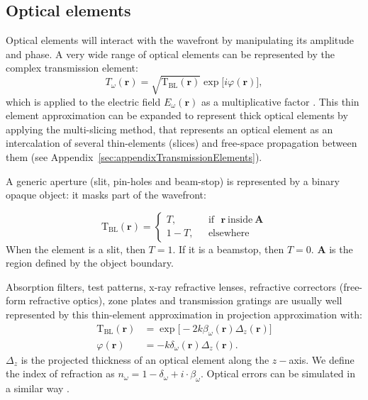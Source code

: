 \documentclass{iucr}              %
\begin{document}
\subsection{Optical elements}\label{sec:OE}

Optical elements will interact with the wavefront by manipulating its amplitude and phase. A very wide range of optical elements can be represented by the complex transmission element:
 \begin{equation}\label{eq:trans_el}
T_\omega(\textbf{r})=\sqrt{\mathrm{T}_\mathrm{BL}(\textbf{r})}\exp{\big[ i\varphi(\textbf{r})\big]},
\end{equation}
which is applied to the electric field $E_\omega(\textbf{r})$ as a multiplicative factor \cite{Cloetens_1996}. This thin element approximation can be expanded to represent thick optical elements by applying the multi-slicing method, that represents an optical element as an intercalation of several thin-elements (slices) and free-space propagation between them \cite{paganin_book, Li2017, Munro2019} (see Appendix~\ref{sec:appendixTransmissionElements}). 

A generic aperture (slit, pin-holes and beam-stop) is represented by a binary opaque object: it masks part of the wavefront:

\begin{equation}
\mathrm{T}_{\text{BL}}(\textbf{r}) =
\left\{
\begin{matrix}
T,  & \mbox{~~if~~}  \textbf{r}~\text{inside}~ \textbf{A}
\\ 
1 - T, & \mbox{~~elsewhere}
\end{matrix}
\right.
\end{equation}
When the element is a slit, then $T=1$. If it is a beamstop, then $T=0$. $\textbf{A}$ is the region defined by the object boundary. 

Absorption filters, test patterns, x-ray refractive lenses, refractive correctors (free-form refractive optics), zone plates and transmission gratings are usually well represented by this thin-element approximation in projection approximation with:
\begin{subequations}
\begin{align}   
    \mathrm{T}_{\text{BL}}(\textbf{r})&=\exp{\big[-2k\beta_\omega(\textbf{r})\Delta_z(\textbf{r})\big]}\label{eq:aux_funcs_transa}  \\
    \varphi(\textbf{r})&=-k\delta_\omega(\textbf{r})\Delta_z(\textbf{r}).\label{eq:aux_funcs_transb}
\end{align}
\end{subequations}
$\Delta_z$ is the projected thickness of an optical element along the $z-$axis. We define the index of refraction as $n_\omega=1-\delta_\omega+i\cdot\beta_\omega$. Optical errors can be simulated in a similar way \cite{Laundy2014,Celestre:mo5214,srioLBL}.
\end{document}
